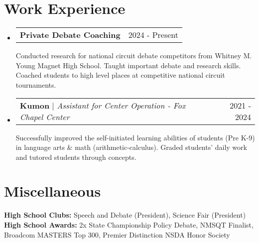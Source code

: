 \documentclass{article}
\makeatletter
\newcommand{\resumeProjectHeading}[2]{
    \item
    \begin{tabular*}{0.97\textwidth}{l@{\extracolsep{\fill}}r}
      \small#1 & #2 \\
    \end{tabular*}\vspace{-7pt}
}
\newcommand{\resumeSubHeadingListStart}{\begin{itemize}[leftmargin=0.15in, label={}]}
\newcommand{\resumeSubHeadingListEnd}{\end{itemize}}
\makeatother
\begin{document}
\section{Work Experience}
  \resumeSubHeadingListStart
        \resumeProjectHeading
          {\textbf{Private Debate Coaching} \vspace{8pt}}{2024 - Present}
          {\small{Conducted research for national circuit debate competitors from Whitney M. Young Magnet High School. Taught important debate and research skills. Coached students to high level places at competitive national circuit tournaments.}}
\resumeSubHeadingListEnd
  \resumeSubHeadingListStart
        \resumeProjectHeading
          {\textbf{Kumon } $|$ \footnotesize\emph{Assistant for Center Operation - Fox Chapel Center}\vspace{8pt}}{2021 - 2024}
          {\small{Successfully improved the self-initiated learning abilities of students (Pre K-9) in language arts \& math
(arithmetic-calculus). Graded students' daily work and tutored students through concepts.}}
\resumeSubHeadingListEnd

\section{Miscellaneous}
 \begin{itemize}[leftmargin=0.15in, label={}]
    \small{\item{
    
     \textbf{High School Clubs: }{Speech and Debate (President), Science Fair (President)} \\
     
     \textbf{High School Awards: }{2x State Championship Policy Debate, NMSQT Finalist, Broadcom MASTERS Top 300, Premier Distinction NSDA Honor Society}\\

     
    }}
 \end{itemize}
\end{document}
